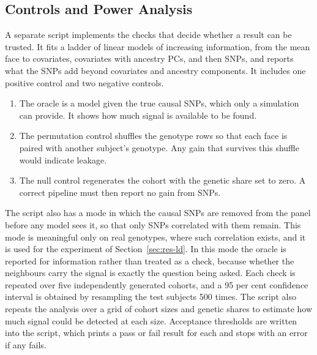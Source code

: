 \subsection{Controls and Power Analysis}
\label{sec:impl-controls}
A separate script implements the checks that decide whether a result can be trusted. It fits a ladder of linear models of increasing information, from the mean face to covariates, covariates with ancestry PCs, and then SNPs, and reports what the SNPs add beyond covariates and ancestry components. It includes one positive control and two negative controls.
\begin{enumerate}
\item The oracle is a model given the true causal SNPs, which only a simulation can provide. It shows how much signal is available to be found.
\item The permutation control shuffles the genotype rows so that each face is paired with another subject's genotype. Any gain that survives this shuffle would indicate leakage.
\item The null control regenerates the cohort with the genetic share set to zero. A correct pipeline must then report no gain from SNPs.
\end{enumerate}
The script also has a mode in which the causal SNPs are removed from the panel before any model sees it, so that only SNPs correlated with them remain. This mode is meaningful only on real genotypes, where such correlation exists, and it is used for the experiment of Section~\ref{sec:res-ld}. In this mode the oracle is reported for information rather than treated as a check, because whether the neighbours carry the signal is exactly the question being asked.
Each check is repeated over five independently generated cohorts, and a 95 per cent confidence interval is obtained by resampling the test subjects 500 times. The script also repeats the analysis over a grid of cohort sizes and genetic shares to estimate how much signal could be detected at each size. Acceptance thresholds are written into the script, which prints a pass or fail result for each and stops with an error if any fails.

